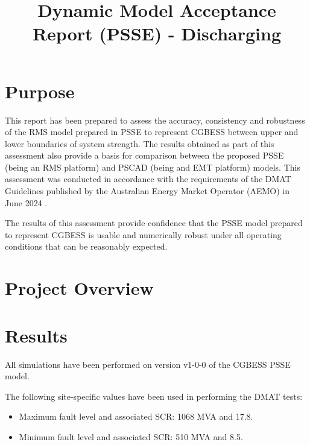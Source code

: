 \documentclass{../grid-link-report}
\title{Dynamic Model Acceptance Report (PSSE) - Discharging}
\newcommand{\projectassetsdir}{../project-assets}
\begin{document}

	\frontmatter
	\maketitle
	
	\makedisclaimer
	\clearpage
	\tableofcontents
	\makerevisionhistorypage
	
	\mainmatter
	
	
	\chapter{Purpose}
	This report has been prepared to assess the accuracy, consistency and robustness of the \ac{RMS} model prepared in PSSE to represent \ac{CGBESS} between upper and lower boundaries of system strength. The results obtained as part of this assessment also provide a basis for comparison between the proposed PSSE (being an \ac{RMS} platform) and PSCAD (being and \ac{EMT} platform) models. This assessment was conducted in accordance with the requirements of the \ac{DMAT} Guidelines published by the Australian Energy Market Operator (AEMO) in June 2024 \cite{dmat-spec}.
	
	The results of this assessment provide confidence that the PSSE model prepared to represent \ac{CGBESS} is usable and numerically robust under all operating conditions that can be reasonably expected.
	
	
	\chapter{Project Overview}
	
	
	\chapter{Results}
	
	All simulations have been performed on version v1-0-0 of the \ac{CGBESS} PSSE model.
	
	The following site-specific values have been used in performing the \ac{DMAT} tests:
	
	\begin{itemize}
		\item Maximum fault level and associated \ac{SCR}: 1068 MVA and 17.8.
		\item Minimum fault level and associated \ac{SCR}: 510 MVA and 8.5.
	\end{itemize}
	
\end{document}
